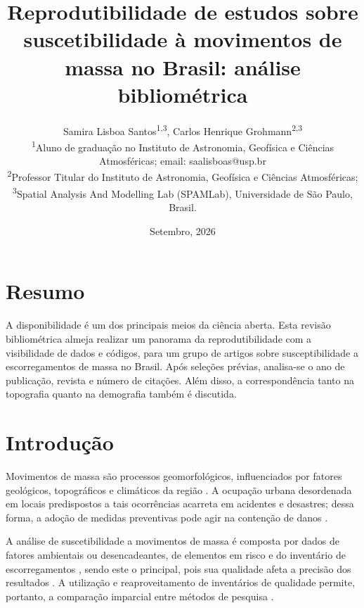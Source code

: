 \documentclass[twocolumn, A4]{article}
\begin{document}
\title{Reprodutibilidade de estudos sobre suscetibilidade à movimentos de massa no Brasil: 
análise bibliométrica}
\author{
	Samira  Lisboa Santos\textsuperscript{1,3},
	Carlos Henrique Grohmann\textsuperscript{2,3}
 	\\[0.2cm]
	{\small \textsuperscript{1}Aluno de graduação no Instituto de Astronomia, Geofísica e Ciências Atmosféricas; email: saalisboas@usp.br} \\
	{\small \textsuperscript{2}Professor Titular do Instituto de Astronomia, Geofísica e Ciências Atmosféricas;} \\
	{\small \textsuperscript{3}Spatial Analysis And Modelling Lab (SPAMLab), Universidade de São Paulo, Brasil.}
}
\date{Setembro, 2026}

\maketitle
\newpage

\section{Resumo}
A disponibilidade é um dos principais meios da ciência aberta. Esta revisão bibliométrica almeja realizar um panorama da reprodutibilidade com a visibilidade de dados e códigos, para um grupo de artigos sobre susceptibilidade a escorregamentos de massa no Brasil. Após seleções prévias, analisa-se o ano de publicação, revista e número de citações. Além disso, a correspondência tanto na topografia quanto na demografia também é discutida.

\section{Introdução}
Movimentos de massa são processos geomorfológicos, influenciados por fatores geológicos, 
topográficos e climáticos da região \citep{Varnes1978}. A ocupação urbana desordenada 
em locais predispostos a tais ocorrências acarreta em acidentes e desastres; dessa forma,
a adoção de medidas preventivas pode agir na contenção de danos \citep{ConhecerPrevenir}. 

A análise de suscetibilidade a movimentos de massa é composta por dados de fatores 
ambientais ou desencadeantes, de elementos em risco e do inventário de escorregamentos 
\citep{VanWesten}, sendo este o principal, pois sua qualidade afeta a precisão 
dos resultados \citep{Steger20162729}. A utilização e reaproveitamento de inventários de 
qualidade permite, portanto, a comparação imparcial entre métodos de pesquisa 
\citep{Coelho2024}. 
\end{document}
